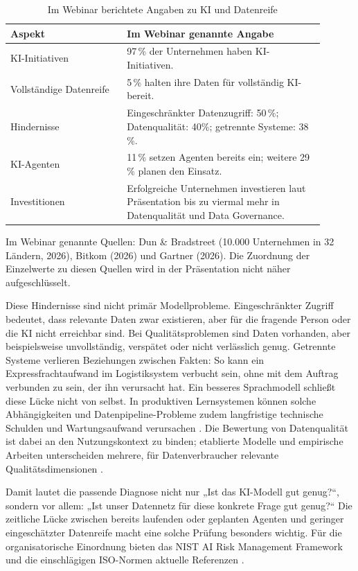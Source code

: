 \documentclass[a4paper,12pt,twoside]{report}
\theoremstyle{definition}
\begin{document}
\begin{table}[htbp]
\centering
\small
\caption{Im Webinar berichtete Angaben zu KI und Datenreife}
\label{tab:readiness}
\begin{tabular}{p{0.33\linewidth}p{0.57\linewidth}}
\toprule
\textbf{Aspekt} & \textbf{Im Webinar genannte Angabe} \\
\midrule
KI-Initiativen & 97\,\% der Unternehmen haben KI-Initiativen. \\
Vollständige Datenreife & 5\,\% halten ihre Daten für vollständig KI-bereit. \\
Hindernisse & Eingeschränkter Datenzugriff: 50\,\%; Datenqualität: 40\%; getrennte Systeme: 38\,\%. \\
KI-Agenten & 11\,\% setzen Agenten bereits ein; weitere 29\,\% planen den Einsatz. \\
Investitionen & Erfolgreiche Unternehmen investieren laut Präsentation bis zu viermal mehr in Datenqualität und Data Governance. \\
\bottomrule
\end{tabular}
\end{table}
\noindent\footnotesize Im Webinar genannte Quellen: Dun \& Bradstreet (10.000 Unternehmen in 32 Ländern, 2026), Bitkom (2026) und Gartner (2026). Die Zuordnung der Einzelwerte zu diesen Quellen wird in der Präsentation nicht näher aufgeschlüsselt.\normalsize

Diese Hindernisse sind nicht primär Modellprobleme. Eingeschränkter Zugriff bedeutet, dass relevante Daten zwar existieren, aber für die fragende Person oder die KI nicht erreichbar sind. Bei Qualitätsproblemen sind Daten vorhanden, aber beispielsweise unvollständig, verspätet oder nicht verlässlich genug. Getrennte Systeme verlieren Beziehungen zwischen Fakten: So kann ein Expressfrachtaufwand im Logistiksystem verbucht sein, ohne mit dem Auftrag verbunden zu sein, der ihn verursacht hat. Ein besseres Sprachmodell schließt diese Lücke nicht von selbst. In produktiven Lernsystemen können solche Abhängigkeiten und Datenpipeline-Probleme zudem langfristige technische Schulden und Wartungsaufwand verursachen \cite{sculley15,polyzotis17}.
Die Bewertung von Datenqualität ist dabei an den Nutzungskontext zu binden; etablierte Modelle und empirische Arbeiten unterscheiden mehrere, für Datenverbraucher relevante Qualitätsdimensionen \cite{iso5259,iso25012,wangstrong96,pipino02}.

Damit lautet die passende Diagnose nicht nur „Ist das KI-Modell gut genug?“, sondern vor allem: „Ist unser Datennetz für diese konkrete Frage gut genug?“ Die zeitliche Lücke zwischen bereits laufenden oder geplanten Agenten und geringer eingeschätzter Datenreife macht eine solche Prüfung besonders wichtig. Für die organisatorische Einordnung bieten das NIST AI Risk Management Framework und die einschlägigen ISO-Normen aktuelle Referenzen \cite{nistairmf23,iso42001,iso23894,euaiact24}.
\end{document}
